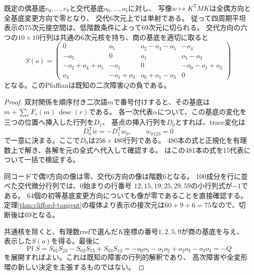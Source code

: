 \begin{proposition}[低階数条件の一次切断と障害のPfaffian]\label{prop:clifford-rank-derivative}
既定の偶基底$e_0,\ldots,e_8$と交代基底$o_0,\ldots,o_5$に対し、
写像$\dot w\mapsto K^{\mathsf T}\dot M K$は全偶方向と全基底変更方向で零となり、
交代6次元上では単射である。
従って四周期平坦表示の75次元接空間は、低階数条件によって69次元に切られる。
交代方向の六つの$10\times10$行列は共通の6次元核を持ち、商の基底を適切に取ると
\[
 S(o)=\begin{pmatrix}
 0&o_5&o_2-o_4-o_5&-o_4\\
 -o_5&0&o_1&o_1-o_3\\
 -o_2+o_4+o_5&-o_1&0&-o_0-o_1+o_3\\
 o_4&-o_1+o_3&o_0+o_1-o_3&0
 \end{pmatrix}
\]
となる。このPfaffianは既知の二次障害$Q$の負である。
\end{proposition}
\begin{proof}
双対関係を順序付き二次語$m$で番号付けすると、その基底は
$m+\sum_r F_r(m)\,\operatorname{desc}(r)$である。
各一次代表$\alpha$について、この基底の変化を三つの位置へ挿入した行列を$D_1$、
基点の挿入行列を$D_0$とすれば、trace変化は
\[
 D_0^{\mathsf T}\dot w=-D_1^{\mathsf T}w_0,\qquad \dot w_{0123}=0
\]
で一意に決まる。ここで$D_0$は$256\times480$行列である。
480本の式と正規化を有理数上で解き、各解を元の全式へ代入して確認する。
はこの481本の式を15代表について一括で検証する。

同コードで偶9方向の像は零、交代6方向の像は階数6となる。
100成分を行に並べた交代微分行列では、0始まりの行番号
$12,15,19,25,29,59$の小行列式が$-1$である。
64個の初等基底変更方向についても像が零であることを直接確認する。
定理\ref{thm:clifford-tangent}の複体より表示の接次元は$60+9+6=75$なので、切断後は69となる。

共通核を除くと、有理数rrefで選んだ$K$座標の番号$1,2,5,9$が商の基底を与え、
表示した$S(o)$を得る。最後に
\[
 \operatorname{Pf}S=S_{01}S_{23}-S_{02}S_{13}+S_{03}S_{12}
 =-o_0o_5-o_1o_2+o_2o_3-o_3o_4=-Q
\]
を展開すればよい。これは既知の障害の行列的解釈であり、
高次障害や全変形環の新しい決定を主張するものではない。
\end{proof}

